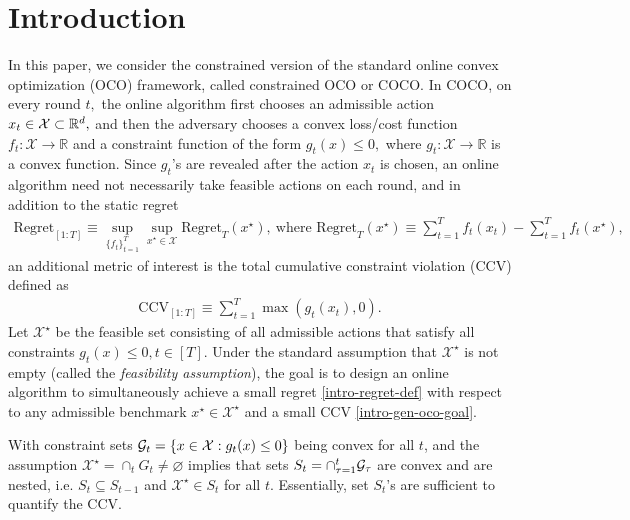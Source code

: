 \section{Introduction}
In this paper, we consider the constrained version of the standard online convex optimization (OCO) framework, called constrained OCO or COCO. In COCO, on every round $t,$ the online algorithm first chooses an admissible action $x_t \in \mathcal{X} \subset {\mathbb{R}}^d,$ 
 and then the adversary chooses a convex loss/cost function $f_t: \mathcal{X} \to \mathbb{R}$ and a constraint function of the form $g_{t}(x) \leq 0,$ where $g_{t}: \mathcal{X} \to \mathbb{R}$ is a convex function. Since $g_{t}$'s are revealed after the action $x_t$ is chosen, an online algorithm need not necessarily take feasible actions on each round, and in addition to the static regret 
 \begin{eqnarray} \label{intro-regret-def}
	\textrm{Regret}_{[1:T]} \equiv \sup_{\{f_t\}_{t=1}^T} \sup_{x^\star \in \mathcal{X}} \textrm{Regret}_T(x^\star), ~\textrm{where~}\textrm{Regret}_T(x^\star) \equiv \sum_{t=1}^T f_t(x_t) - \sum_{t=1}^T f_t(x^\star),
\end{eqnarray}
an additional metric of interest  is the total cumulative constraint violation (CCV)  defined as 
  \begin{eqnarray} \label{intro-gen-oco-goal}
 	\textrm{CCV}_{[1:T]}  \equiv \sum_{t=1}^T \max(g_{t}(x_t),0). 
	\end{eqnarray}
Let $\mathcal{X}^\star$ be the feasible set consisting of all admissible actions that satisfy all constraints $g_{t}(x) \leq 0, t\in [T]$. Under the standard assumption that $\mathcal{X}^\star$ is not empty (called the {\it feasibility assumption}), the goal is to design an online algorithm to simultaneously achieve a small regret \eqref{intro-regret-def} with respect to any admissible benchmark $x^\star \in \mathcal{X}^\star$ and a small CCV \eqref{intro-gen-oco-goal}. 
%

With constraint sets 
${\cal G}_t = \{x\in \mathcal{X} : g_t(x)\le 0\}$ being convex for all $t$, and the assumption $\mathcal{X}^\star = \cap_t G_t  \neq \varnothing $  implies that sets
$S_t = \cap_{\tau=1}^t {\cal G}_\tau$ are convex and are nested, i.e. $S_t\subseteq S_{t-1}$ and $\mathcal{X}^\star \in S_t$ for all $t$. Essentially, set $S_t$'s are sufficient to quantify the CCV.

